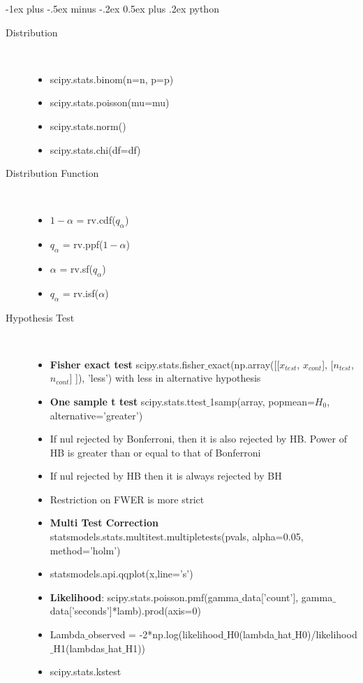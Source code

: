 \documentclass[a4paper, 10pt,landscape]{article}
\makeatletter
\renewcommand{\section}{\@startsection{section}{1}{0mm}%
                                {-1ex plus -.5ex minus -.2ex}%
                                {0.5ex plus .2ex}%
                                {\normalfont\large\bfseries}}
\makeatother
\begin{document}
\begin{multicols*}{3}
\section{python}
\begin{description}
	\item[Distribution] ~
		\begin{itemize}
			\item scipy.stats.binom(n=n, p=p)
			\item scipy.stats.poisson(mu=mu)
			\item scipy.stats.norm()
			\item scipy.stats.chi(df=df)
		\end{itemize}
	\item[Distribution Function]~
		\begin{itemize}
			\item $1 - \alpha$ = rv.cdf($q_{\alpha}$) 
			\item $q_{\alpha}$ = rv.ppf($1 - \alpha$)
			\item $\alpha$ = rv.sf($q_{\alpha}$)
			\item $q_{\alpha}$ = rv.isf($\alpha$)
		\end{itemize}
	\item[Hypothesis Test]~
		\begin{itemize}
			\item {\bf Fisher exact test} scipy.stats.fisher$\_$exact(np.array([[$x_{test}$, $x_{cont}$], [$n_{test}$, $n_{cont}$] ]), 'less') with less in alternative hypothesis
			\item {\bf One sample t test} scipy.stats.ttest$\_$1samp(array, popmean=$H_0$, alternative='greater')
			\item If nul rejected by Bonferroni, then it is also rejected by HB. Power of HB is greater than or equal to that of Bonferroni
			\item If nul rejected by HB then it is always rejected by BH
			\item Restriction on FWER is more strict
			\item {\bf Multi Test Correction} statsmodels.stats.multitest.multipletests(pvals, alpha=0.05, method='holm')
			\item statsmodels.api.qqplot(x,line='s')		
			\item {\bf Likelihood}: scipy.stats.poisson.pmf(gamma$\_$data['count'], gamma$\_$data['seconds']*lamb).prod(axis=0)
			\item Lambda$\_$observed = -2*np.log(likelihood$\_$H0(lambda$\_$hat$\_$H0)/likelihood$\_$H1(lambdas$\_$hat$\_$H1))	
			\item scipy.stats.kstest
	\end{itemize}
\end{description}



\end{multicols*}
\end{document}
